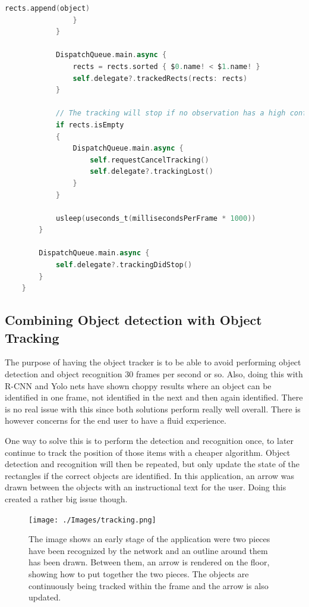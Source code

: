 \begin{lstlisting}[language=swift]
                    rects.append(object)
                }
            }

            DispatchQueue.main.async {
                rects = rects.sorted { $0.name! < $1.name! }
                self.delegate?.trackedRects(rects: rects)
            }
            
            // The tracking will stop if no observation has a high confidence value
            if rects.isEmpty
            {
                DispatchQueue.main.async {
                    self.requestCancelTracking()
                    self.delegate?.trackingLost()
                }
            }

            usleep(useconds_t(millisecondsPerFrame * 1000))
        }
        
        DispatchQueue.main.async {
            self.delegate?.trackingDidStop()
        }
    }
\end{lstlisting}


\subsection{Combining Object detection with Object Tracking}
The purpose of having the object tracker is to be able to avoid performing object detection and object recognition 30 frames per second or so. Also, doing this with R-CNN and Yolo nets have shown choppy results where an object can be identified in one frame, not identified in the next and then again identified.
There is no real issue with this since both solutions perform really well overall. There is however concerns for the end user to have a fluid experience.

One way to solve this is to perform the detection and recognition once, to later continue to track the position of those items with a cheaper algorithm.
Object detection and recognition will then be repeated, but only update the state of the rectangles if the correct objects are identified.
In this application, an arrow was drawn between the objects with an instructional text for the user. Doing this created a rather big issue though.

\begin{figure}[!hbtp]
\begin{center}
\texttt{[image: ./Images/tracking.png]}
\caption{The image shows an early stage of the application were two pieces have been recognized by the network and an outline around them has been drawn. Between them, an arrow is rendered on the floor, showing how to put together the two pieces. The objects are continuously being tracked within the frame and the arrow is also updated.}
\label{fig:tracking}
\end{center}
\end{figure}

